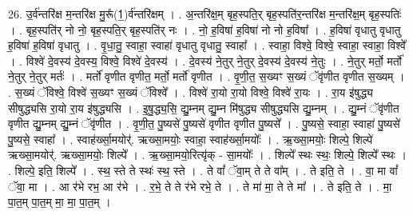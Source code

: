 \documentclass[17pt]{extarticle}
\begin{document}
26. उ॒र्व॑न्तरि॑क्ष म॒न्तरि॑क्ष मु॒रू᳚(1॒)र्व॑न्तरि॑क्षम् । . अ॒न्तरि॑क्ष॒म् बृह॒स्पति॒र् बृह॒स्पति॑र॒न्तरि॑क्ष म॒न्तरि॑क्ष॒म् बृह॒स्पतिः॑ । . बृह॒स्पति॑र् नो नो॒ बृह॒स्पति॒र् बृह॒स्पति॑र् नः । . नो॒ ह॒विषा॑ ह॒विषा॑ नो नो ह॒विषा᳚ । . ह॒विषा॑ वृधातु वृधातु ह॒विषा॑ ह॒विषा॑ वृधातु । . वृ॒धा॒तु॒ स्वाहा॒ स्वाहा॑ वृधातु वृधातु॒ स्वाहा᳚ । . स्वाहा॒ विश्वे॒ विश्वे॒ स्वाहा॒ स्वाहा॒ विश्वे᳚ । . विश्वे॑ दे॒वस्य॑ दे॒वस्य॒ विश्वे॒ विश्वे॑ दे॒वस्य॑ । . दे॒वस्य॑ ने॒तुर् ने॒तुर् दे॒वस्य॑ दे॒वस्य॑ ने॒तुः । . ने॒तुर् मर्तो॒ मर्तो॑ ने॒तुर् ने॒तुर् मर्तः॑ । . मर्तो॑ वृणीत वृणीत॒ मर्तो॒ मर्तो॑ वृणीत । . वृ॒णी॒त॒ स॒ख्यꣳ स॒ख्यं ॅवृ॑णीत वृणीत स॒ख्यम् । . स॒ख्यं ॅविश्वे॒ विश्वे॑ स॒ख्यꣳ स॒ख्यं ॅविश्वे᳚ । . विश्वे॑ रा॒यो रा॒यो विश्वे॒ विश्वे॑ रा॒यः । . रा॒य इ॑षुद्ध्य सीषुद्ध्यसि रा॒यो रा॒य इ॑षुद्ध्यसि । . इ॒षु॒द्ध्य॒सि॒ द्यु॒म्नम् द्यु॒म्न मि॑षुद्ध्य सीषुद्ध्यसि द्यु॒म्नम् । . द्यु॒म्नं ॅवृ॑णीत वृणीत द्यु॒म्नम् द्यु॒म्नं ॅवृ॑णीत । . वृ॒णी॒त॒ पु॒ष्यसे॑ पु॒ष्यसे॑ वृणीत वृणीत पु॒ष्यसे᳚ । . पु॒ष्यसे॒ स्वाहा॒ स्वाहा॑ पु॒ष्यसे॑ पु॒ष्यसे॒ स्वाहा᳚ । . स्वाह॑र्ख्सा॒मयोर्॑. ऋख्सा॒मयोः॒ स्वाहा॒ स्वाह॑र्ख्सा॒मयोः᳚ । . ऋ॒ख्सा॒मयोः॒ शिल्पे॒ शिल्पे॑ ऋख्सा॒मयोर्॑. ऋख्सा॒मयोः॒ शिल्पे᳚ । . ऋ॒ख्सा॒मयो॒रित्यृ॑क् - सा॒मयोः᳚ । . शिल्पे᳚ स्थः स्थः॒ शिल्पे॒ शिल्पे᳚ स्थः । . शिल्पे॒ इति॒ शिल्पे᳚ । . स्थ॒ स्ते ते स्थः॑ स्थ॒ स्ते । . ते वां᳚ ॅवा॒म् ते ते वा᳚म् । . ते इति॒ ते । . वा॒ मा वां᳚ ॅवा॒ मा । . आ र॑भे रभ॒ आ र॑भे । . र॒भे॒ ते ते र॑भे रभे॒ ते । . ते मा॑ मा॒ ते ते मा᳚ । . ते इति॒ ते । . मा॒ पा॒त॒म् पा॒त॒म् मा॒ मा॒ पा॒त॒म् । \newline
\end{document}

